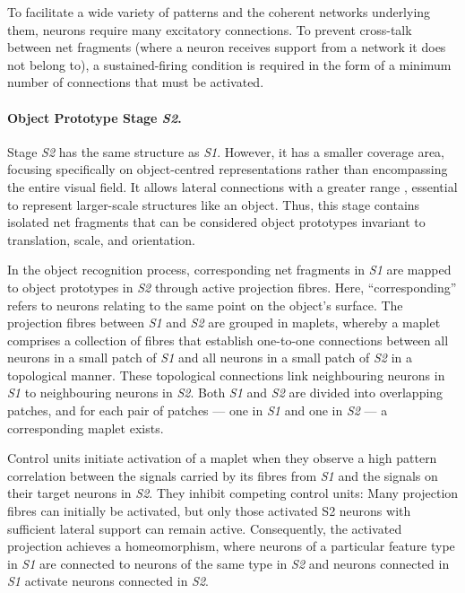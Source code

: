 To facilitate a wide variety of patterns and the coherent networks underlying them, neurons require many excitatory connections. To prevent cross-talk between net fragments (where a neuron receives support from a network it does not belong to), a sustained-firing condition is required in the form of a minimum number of connections that must be activated.

\paragraph{Object Prototype Stage \emph{S2}.} Stage \emph{S2} has the same structure as \emph{S1}. However, it has a smaller coverage area, focusing specifically on object-centred representations rather than encompassing the entire visual field. It allows lateral connections with a greater range , essential to represent larger-scale structures like an object. 
Thus, this stage contains isolated net fragments that can be considered object prototypes invariant to translation, scale, and orientation.

In the object recognition process, corresponding net fragments in \emph{S1} are mapped to object prototypes in \emph{S2} through active projection fibres. Here, ``corresponding'' refers to neurons relating to the same point on the object's surface.
The projection fibres between \emph{S1} and \emph{S2} are grouped in maplets, whereby a maplet comprises a collection of fibres that establish one-to-one connections between all neurons in a small patch of \emph{S1} and all neurons in a small patch of \emph{S2} in a topological manner. These topological connections link neighbouring neurons in \emph{S1} to neighbouring neurons in \emph{S2}. Both \emph{S1} and \emph{S2} are divided into overlapping patches, and for each pair of patches — one in \emph{S1} and one in \emph{S2} — a corresponding maplet exists.

Control units initiate activation of a maplet when they observe a high pattern correlation between the signals carried by its fibres from \emph{S1} and the signals on their target neurons in \emph{S2}. They inhibit competing control units: Many projection fibres can initially be activated, but only those activated S2 neurons with sufficient lateral support can remain active.
Consequently, the activated projection achieves a homeomorphism, where neurons of a particular feature type in \emph{S1} are connected to neurons of the same type in \emph{S2} and neurons connected in \emph{S1} activate neurons connected in \emph{S2}.

